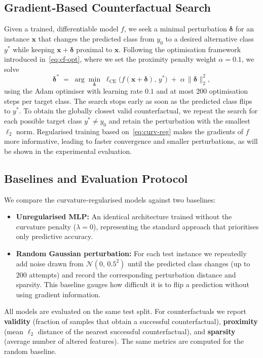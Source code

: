 \documentclass[11pt,a4paper]{article}
\begin{document}
\subsection{Gradient‑Based Counterfactual Search}
Given a trained, differentiable model \(f\), we seek a minimal perturbation \(\boldsymbol{\delta}\) for an instance \(\mathbf{x}\) that changes the predicted class from \(y_0\) to a desired alternative class \(y^*\) while keeping \(\mathbf{x}+\boldsymbol{\delta}\) proximal to \(\mathbf{x}\). Following the optimisation framework introduced in~\eqref{eq:cf-opt}, where we set the proximity penalty weight \(\alpha = 0.1\), we solve
\begin{equation}
\boldsymbol{\delta}^* \;=\; \arg\min_{\boldsymbol{\delta}}\;
   \ell_{\mathrm{CE}}\bigl(f(\mathbf{x}+\boldsymbol{\delta}),\,y^*\bigr)
   \;+\; \alpha\,\|\boldsymbol{\delta}\|_2^2,
\end{equation}
using the Adam optimiser with learning rate \(0.1\) and at most \(200\) optimisation steps per target class. The search stops early as soon as the predicted class flips to \(y^*\). To obtain the globally closest valid counterfactual, we repeat the search for each possible target class \(y^*\neq y_0\) and retain the perturbation with the smallest \(\ell_2\) norm. Regularised training based on~\eqref{eq:curv-reg} makes the gradients of \(f\) more informative, leading to faster convergence and smaller perturbations, as will be shown in the experimental evaluation.

\subsection{Baselines and Evaluation Protocol}
We compare the curvature‑regularised models against two baselines:
\begin{itemize}
  \item \textbf{Unregularised MLP:} An identical architecture trained without the curvature penalty (\(\lambda=0\)), representing the standard approach that prioritises only predictive accuracy.
  \item \textbf{Random Gaussian perturbation:} For each test instance we repeatedly add noise drawn from \(\mathcal{N}(0,\,0.5^2)\) until the predicted class changes (up to \(200\) attempts) and record the corresponding perturbation distance and sparsity. This baseline gauges how difficult it is to flip a prediction without using gradient information.
\end{itemize}
All models are evaluated on the same test split. For counterfactuals we report \textbf{validity} (fraction of samples that obtain a successful counterfactual), \textbf{proximity} (mean \(\ell_2\) distance of the nearest successful counterfactual), and \textbf{sparsity} (average number of altered features). The same metrics are computed for the random baseline.
\end{document}
